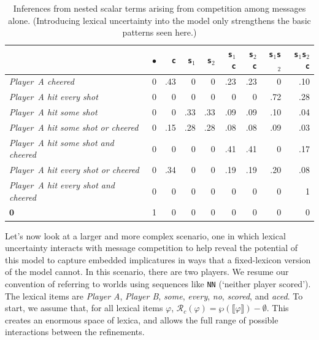 \documentclass[leqno,12pt]{article}
\newcommand{\word}[1]{\emph{#1}}
\newcommand{\graycell}[1]{{\cellcolor[gray]{.8}#1}}
\newcommand{\sem}[1]{\ensuremath{\llbracket#1\rrbracket}}
\newcommand{\nullmsg}{\mathbf{0}}
\newcommand{\Refine}[1][c]{\mathcal{R}_{#1}}
\newcommand{\world}[1]{\texttt{#1}}
\begin{document}
{\begin{table}[tp]
  \centering
  \renewcommand{\arraystretch}{1.05}
  \setlength{\tabcolsep}{8pt}
  \renewcommand{\graycell}[1]{#1}
  \begin{tabular}[c]{l *{8}{r} }
    \toprule
    & \world{$\bullet$} & \world{c} & \world{s$_{1}$} & \world{s$_{2}$} & \world{s$_{1}$c} & \world{s$_{2}$c} & \world{s$_{1}$s$_{2}$} & \world{s$_{1}$s$_{2}$c}\\
    \midrule
    \word{Player~A cheered} &    0 &   \graycell{.43} &    0 &    0 &   .23 &   .23 &    0 &    .10\\
    \word{Player~A hit every shot} &    0 &    0 &    0 &    0 &    0 &    0 &   \graycell{.72} &   .28\\
    \word{Player~A hit some shot} &    0 &    0 &   \graycell{.33} &   \graycell{.33} &   .09 &   .09 &    .10 &   .04\\
    \word{Player~A hit some shot or cheered} &    0 &   .15 &   \graycell{.28} &   \graycell{.28} &   .08 &   .08 &   .09 &   .03\\
    \word{Player~A hit some shot and cheered} &    0 &    0 &    0 &    0 &   \graycell{.41} &   \graycell{.41} &    0 &   .17\\
    \word{Player~A hit every shot or cheered} &    0 &   \graycell{.34} &    0 &    0 &   .19 &   .19 &    .20 &   .08\\
    \word{Player~A hit every shot and cheered} &    0 &    0 &    0 &    0 &    0 &    0 &    0 &    \graycell{1}\\
    $\nullmsg$ &   \graycell{1} &    0 &    0 &    0 &    0 &    0 &    0 &    0\\
    \bottomrule
  \end{tabular}
  \caption{Inferences from nested scalar terms arising
    from competition among messages alone. (Introducing lexical 
    uncertainty into the model only strengthens 
    the basic patterns seen here.)}\label{tab:sauerland}
\end{table}

Let's now look at a larger and more complex scenario, one in which
lexical uncertainty interacts with message competition to help reveal
the potential of this model to capture embedded implicatures in ways
that a fixed-lexicon version of the model cannot.  In this scenario,
there are two players. We resume our convention of referring to worlds
using sequences like \world{NN} (`neither player scored'). The lexical
items are \word{Player A}, \word{Player B}, \word{some}, \word{every},
\word{no}, \word{scored}, and \word{aced}.  To start, we assume that,
for all lexical items $\varphi$,
$\Refine(\varphi) = \wp(\sem{\varphi}){-}\emptyset$.  This creates an
enormous space of lexica, and allows the full range of possible
interactions between the refinements.

}
\end{document}
